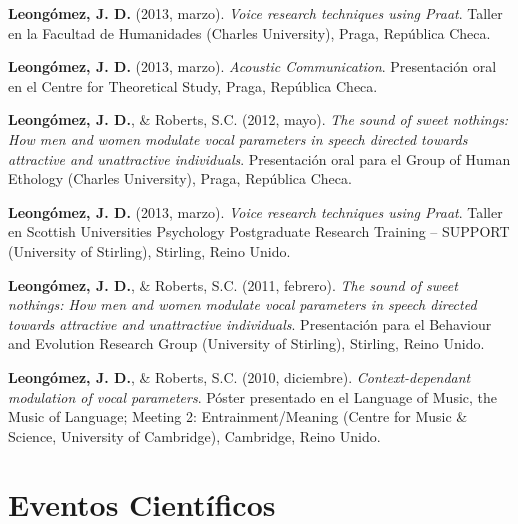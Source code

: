 \documentclass[11pt,a4paper,]{awesome-cv}
\begin{document}
\textbf{Leongómez, J. D.} (2013, marzo). \emph{Voice research techniques
using Praat}. Taller en la Facultad de Humanidades (Charles University),
Praga, República Checa.

\textbf{Leongómez, J. D.} (2013, marzo). \emph{Acoustic Communication}.
Presentación oral en el Centre for Theoretical Study, Praga, República
Checa.

\textbf{Leongómez, J. D.}, \& Roberts, S.C. (2012, mayo). \emph{The
sound of sweet nothings: How men and women modulate vocal parameters in
speech directed towards attractive and unattractive individuals}.
Presentación oral para el Group of Human Ethology (Charles University),
Praga, República Checa.

\textbf{Leongómez, J. D.} (2013, marzo). \emph{Voice research techniques
using Praat}. Taller en Scottish Universities Psychology Postgraduate
Research Training -- SUPPORT (University of Stirling), Stirling, Reino
Unido.

\textbf{Leongómez, J. D.}, \& Roberts, S.C. (2011, febrero). \emph{The
sound of sweet nothings: How men and women modulate vocal parameters in
speech directed towards attractive and unattractive individuals}.
Presentación para el Behaviour and Evolution Research Group (University
of Stirling), Stirling, Reino Unido.

\textbf{Leongómez, J. D.}, \& Roberts, S.C. (2010, diciembre).
\emph{Context-dependant modulation of vocal parameters}. Póster
presentado en el Language of Music, the Music of Language; Meeting 2:
Entrainment/Meaning (Centre for Music \& Science, University of
Cambridge), Cambridge, Reino Unido.

\endgroup

\section{Eventos Científicos}\label{eventos-cientuxedficos}
\end{document}

